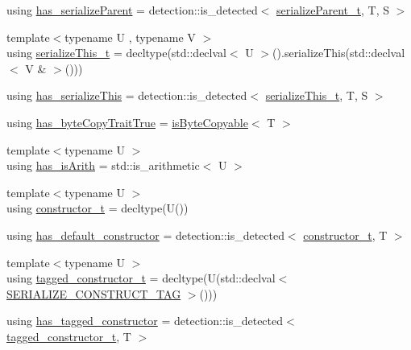 \begin{DoxyCompactItemize}
\item 
using \hyperlink{structcheckpoint_1_1_serializable_traits_a4785b7f54369ec889ac5a25a8256a578}{has\+\_\+serialize\+Parent} = detection\+::is\+\_\+detected$<$ \hyperlink{structcheckpoint_1_1_serializable_traits_a38585e5b9aa0653c08ff48504e922ad5}{serialize\+Parent\+\_\+t}, T, S $>$
\item 
{\footnotesize template$<$typename U , typename V $>$ }\\using \hyperlink{structcheckpoint_1_1_serializable_traits_ac81eb64532a65d97dc995e582ef708ad}{serialize\+This\+\_\+t} = decltype(std\+::declval$<$ U $>$().serialize\+This(std\+::declval$<$ V \& $>$()))
\item 
using \hyperlink{structcheckpoint_1_1_serializable_traits_adc99520813c22cf61ab70ba2fea3cdc6}{has\+\_\+serialize\+This} = detection\+::is\+\_\+detected$<$ \hyperlink{structcheckpoint_1_1_serializable_traits_ac81eb64532a65d97dc995e582ef708ad}{serialize\+This\+\_\+t}, T, S $>$
\item 
using \hyperlink{structcheckpoint_1_1_serializable_traits_a8e42305be1264b105f525ae7dff36c15}{has\+\_\+byte\+Copy\+Trait\+True} = \hyperlink{structcheckpoint_1_1is_byte_copyable}{is\+Byte\+Copyable}$<$ T $>$
\item 
{\footnotesize template$<$typename U $>$ }\\using \hyperlink{structcheckpoint_1_1_serializable_traits_a8a8b20be974e219f4fb39b4346be0536}{has\+\_\+is\+Arith} = std\+::is\+\_\+arithmetic$<$ U $>$
\item 
{\footnotesize template$<$typename U $>$ }\\using \hyperlink{structcheckpoint_1_1_serializable_traits_aa0430155930461d346b90681db234d84}{constructor\+\_\+t} = decltype(U())
\item 
using \hyperlink{structcheckpoint_1_1_serializable_traits_a824afd2953233388cbc3223a82c75df8}{has\+\_\+default\+\_\+constructor} = detection\+::is\+\_\+detected$<$ \hyperlink{structcheckpoint_1_1_serializable_traits_aa0430155930461d346b90681db234d84}{constructor\+\_\+t}, T $>$
\item 
{\footnotesize template$<$typename U $>$ }\\using \hyperlink{structcheckpoint_1_1_serializable_traits_a5a1f289a5008468335f22e288a96d861}{tagged\+\_\+constructor\+\_\+t} = decltype(U(std\+::declval$<$ \hyperlink{namespacecheckpoint_a7ff642cff4d72d01a16ab10e9bc363ef}{S\+E\+R\+I\+A\+L\+I\+Z\+E\+\_\+\+C\+O\+N\+S\+T\+R\+U\+C\+T\+\_\+\+T\+AG} $>$()))
\item 
using \hyperlink{structcheckpoint_1_1_serializable_traits_a3388d17f4748bf899e063b3d05e0dbe4}{has\+\_\+tagged\+\_\+constructor} = detection\+::is\+\_\+detected$<$ \hyperlink{structcheckpoint_1_1_serializable_traits_a5a1f289a5008468335f22e288a96d861}{tagged\+\_\+constructor\+\_\+t}, T $>$

\end{DoxyCompactItemize}
